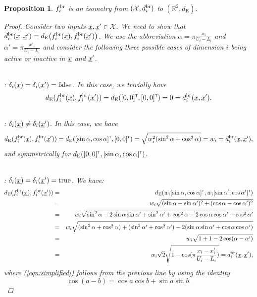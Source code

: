 \documentclass[letterpaper]{article}
\newcommand{\vect}[1]{\underline{\smash{#1}}}
\renewcommand{\v}[1]{\vect{#1}}
\newcommand{\reals}{\mathds{R}}
\newcommand{\sX}{\mathcal{X}}
\newcommand{\br}{^{\text{\textnormal{br}}}}
\newcommand\transpose{{\textrm{\tiny{\sf{T}}}}}
\newtheorem{prop}[thm]{Proposition}
\begin{document}
\begin{prop}$f_i\br$ is an isometry from $(\sX, d\br_i)$ to $(\reals^2, d_{{\text{E}}})$.
\label{prop:f_d_cont_isometric}
\begin{proof}
Consider two inputs $\v{x},\v{x}' \in \sX$. We need to show that $d\br_i(\v{x},\v{x}') = d_{\text{E}}\bigl(f_i\br(\v{x}),f_i\br(\v{x}')\bigr)$.
We use the abbreviation $\alpha = \pi\frac{x_i}{U_i-L_i}$ and $\alpha' = \pi\frac{x'_i}{U_i-L_i}$ and consider the following three possible cases of dimension $i$ being active or inactive in $\v{x}$ and $\v{x}'$.

~\\: $\delta_i(\v{x}) = \delta_i(\v{x}') = \textrm{false}$.
In this case, we trivially have 
\[d_{\text{E}}(f_i\br(\v{x}),f_i\br(\v{x}')) = d_{\text{E}}([0,0]^\transpose, [0,0]^\transpose) = 0 = d\br_i(\v{x},\v{x}').\]

~\\: $\delta_i(\v{x}) \neq \delta_i(\v{x}')$. In this case, we have
\[d_{\text{E}}(f_i\br(\v{x}),f_i\br(\v{x}')) = d_{\text{E}}([\sin{\alpha}, \cos{\alpha}]^\transpose, [0,0]^\transpose) = \sqrt{w_i^2 (\sin^2{\alpha} + \cos^2{\alpha})} = w_i = d\br_i(\v{x},\v{x}'),\]
and symmetrically for $d_{\text{E}}([0,0]^\transpose, [\sin{\alpha}, \cos{\alpha}]^\transpose)$.

~\\: $\delta_i(\v{x}) = \delta_i(\v{x}') = \textrm{true}$. We have:
\begin{eqnarray}
\nonumber{}d_{\text{E}}(f_i\br(\v{x}),f_i\br(\v{x}')) & = & d_{\text{E}}(w_i [\sin{\alpha}, \cos{\alpha}]^\transpose, w_i [\sin{\alpha'}, \cos{\alpha'}]^\transpose)\\ 
\nonumber{}& = & w_i \sqrt{(\sin{\alpha}-\sin{\alpha'})^2+ (\cos{\alpha}-\cos{\alpha'})^2}\\
\nonumber{}& = & w_i \sqrt{\sin^2{\alpha} -2 \sin{\alpha}\sin{\alpha'} + \sin^2{\alpha'}  + \cos^2{\alpha} -2 \cos{\alpha}\cos{\alpha'} + \cos^2{\alpha'} }\\
\nonumber{}& = & w_i \sqrt{(\sin^2{\alpha}+\cos^2{\alpha})   +  (\sin^2{\alpha'}+\cos^2{\alpha'})   -2 (\sin{\alpha}\sin{\alpha'} + \cos{\alpha}\cos{\alpha'})}\nonumber\\
& = & w_i \sqrt{ 1+1-2 \cos(\alpha-\alpha')}\nonumber\\
& = & w_i \sqrt{2} \sqrt{1 - \cos(\pi \frac{x_i-x_i'}{U_i-L_i})} = d\br_i(\v{x}, \v{x}'),\label{eqn:simplified}
\end{eqnarray}
where (\ref{eqn:simplified}) follows from the previous line by using the identity 
\[\cos{(a-b)} = \cos{a}\cos{b} + \sin{a}\sin{b}.\]
\end{proof}
\end{prop}
\end{document}
